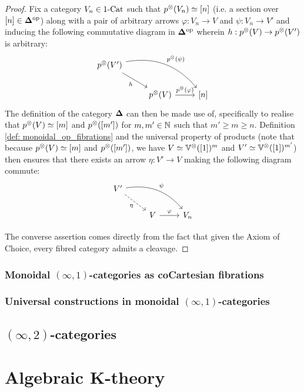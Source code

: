                 \begin{proof}
                    Fix a category $V_n \in 1\text{-}\mathrm{Cat}$ such that $p^{\tensor}(V_n) \cong [n]$ (i.e. a section over $[n] \in \mathbf{\Delta}^{\mathrm{op}}$) along with a pair of arbitrary arrows $\varphi: V_n \to V$ and $\psi: V_n \to V'$ and inducing the following commutative diagram in $\mathbf{\Delta}^{\mathrm{op}}$ wherein $h: p^{\tensor}(V) \to p^{\tensor}(V')$ is arbitrary:
                        $$
                            \begin{tikzcd}
                                p^{\tensor}(V') \arrow[rd, "h"'] \arrow[rrd, "p^{\tensor}(\psi)", bend left] &                                                  &       \\
                                                                                                             & p^{\tensor}(V) \arrow[r, "p^{\tensor}(\varphi)"] & {[n]}
                            \end{tikzcd}
                        $$
                    The definition of the category $\mathbf{\Delta}$ can then be made use of, specifically to realise that $p^{\tensor}(V) \cong [m]$ and $p^{\tensor}([m'])$ for $m, m' \in \mathbb{N}$ such that $m' \geq m \geq n$. Definition \ref{def: monoidal_op_fibrations} and the universal property of products (note that because $p^{\tensor}(V) \cong [m]$ and $p^{\tensor}([m'])$, we have $V \cong \V^{\tensor}([1])^m$ and $V' \cong \V^{\tensor}([1])^{m'}$) then ensures that there exists an arrow $\eta: V' \to V$ making the following diagram commute:
                        $$
                            \begin{tikzcd}
                                V' \arrow[rd, "\eta"', dashed] \arrow[rrd, "\psi", bend left] &                                                  &       \\
                                                                                                             & V \arrow[r, "\varphi"] & {V_n}
                            \end{tikzcd}
                        $$
                        
                    The converse assertion comes directly from the fact that given the Axiom of Choice, every fibred category admits a cleavage.
                \end{proof}
            
        \subsubsection{Monoidal \texorpdfstring{$(\infty, 1)$}{}-categories as coCartesian fibrations}
        
        \subsubsection{Universal constructions in monoidal \texorpdfstring{$(\infty, 1)$}{}-categories}
    
    \subsection{\texorpdfstring{$(\infty, 2)$}{}-categories}
    
\section{Algebraic K-theory}